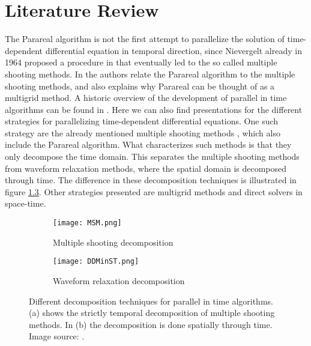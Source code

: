 \chapter{Literature Review} \label{lit_chap}
The Parareal algorithm is not the first attempt to parallelize the solution of time-dependent differential equation in temporal direction, since Nievergelt already in 1964 proposed a procedure in \cite{nievergelt1964parallel} that eventually led to the so called multiple shooting methods. In \cite{gander2007superlinear} the authors relate the Parareal algorithm to the multiple shooting methods, and also explains why Parareal can be thought of as a multigrid method. A historic overview of the development of parallel in time algorithms can be found in \cite{gander201550}. Here we can also find presentations for the different strategies for parallelizing time-dependent differential equations. One such strategy are the already mentioned multiple shooting methods \cite{nievergelt1964parallel,bellen1989parallel}, which also include the Parareal algorithm. What characterizes such methods is that they only decompose the time domain. This separates the multiple shooting methods from waveform relaxation methods\cite{lelarasmee1982waveform,gander1996overlapping}, where the spatial domain is decomposed through time. The difference in these decomposition techniques is illustrated in figure \ref{fig:fig}. Other strategies presented are multigrid \cite{hackbusch1985parabolic,lubich1987multi,horton1995space} methods and direct solvers in space-time\cite{miranker1967parallel,maday2008parallelization,guttel2013parallel}.
\\
\begin{figure}[h]
\centering
\begin{subfigure}{.5\textwidth}
  \centering
  \texttt{[image: MSM.png]}
  \caption{Multiple shooting decomposition}
  \label{fig:sfig1}
\end{subfigure}%
\begin{subfigure}{.5\textwidth}
  \centering
  \texttt{[image: DDMinST.png]}
  \caption{Waveform relaxation decomposition}
  \label{fig:sfig2}
\end{subfigure}
\caption{Different decomposition techniques for parallel in time algorithms. (a) shows the strictly temporal decomposition of multiple shooting methods. In (b) the decomposition is done spatially through time. Image source: \cite{gander201550}.}
\label{fig:fig}
\end{figure}
\noindent
\\
